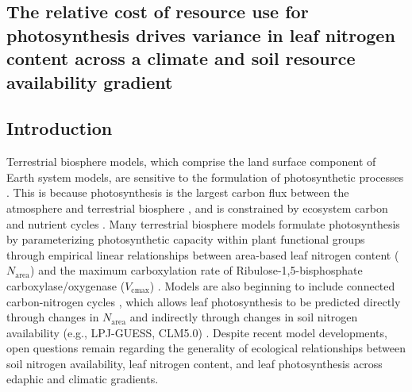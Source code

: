 \begin{singlespace}
    \chapter{\textbf{The relative cost of resource use for photosynthesis drives variance in leaf nitrogen content across a climate and soil resource availability gradient}}
\end{singlespace}

\section{Introduction}
\noindent Terrestrial biosphere models, which comprise the land surface component of Earth system models, are sensitive to the formulation of photosynthetic processes . This is because photosynthesis is the largest carbon flux between the atmosphere and terrestrial biosphere , and is constrained by ecosystem carbon and nutrient cycles . Many terrestrial biosphere models formulate photosynthesis by parameterizing photosynthetic capacity within plant functional groups through empirical linear relationships between area-based leaf nitrogen content ($N_\mathrm{area}$) and the maximum carboxylation rate of Ribulose-1,5-bisphosphate carboxylase/oxygenase ($V_\mathrm{cmax}$) . Models are also beginning to include connected carbon-nitrogen cycles , which allows leaf photosynthesis to be predicted directly through changes in $N_\mathrm{area}$ and indirectly through changes in soil nitrogen availability (e.g., LPJ-GUESS, CLM5.0) . Despite recent model developments, open questions remain regarding the generality of ecological relationships between soil nitrogen availability, leaf nitrogen content, and leaf photosynthesis across edaphic and climatic gradients.


